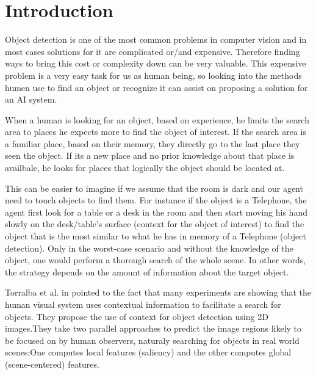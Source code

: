 \chapter{Introduction}
\label{Introduction.ch}
 Object detection is one of the most common problems in computer vision and in most cases solutions for it are complicated or/and expensive. Therefore finding ways to bring this cost or complexity down can be very valuable. This expensive problem is a very easy task for us as human being, so looking into the methods humen use to find an object or recognize it can assist on proposing a solution for an AI system.
 
When a human is looking for an object, based on experience, he limits the search area to places he expects more to find the object of interest. If the search area is a familiar place, based on their memory, they directly go to the last place they seen the object. If its a new place and no prior knowledge about that place is availbale, he looks for places that logically the object should be located at. 

This can be easier to imagine if we assume that the room is dark and our agent need to touch objects to find them. For instance if the object is a Telephone, the agent first look for a table or a desk in the room and then start moving his hand slowly on the desk/table's surface (context for the object of interest) to find the object that is the most similar to what he has in memory of a Telephone (object detection). 
Only in the worst-case scenario and without the knowledge of the object, one would perform a thorough search of the 
whole scene.
In other words, the strategy depends on the amount of information about the target object.



Torralba et al. in \cite{eyeMovement} pointed to the fact that many experiments are showing that the human visual system uses 
contextual information to facilitate a search for objects. They propose the use of context for object detection using 2D images.They take two parallel approaches to predict the image regions likely to be focused on by human observers, naturaly searching for objects in real world scenes;One computes local features (saliency) and the other computes global (scene-centered) features.

